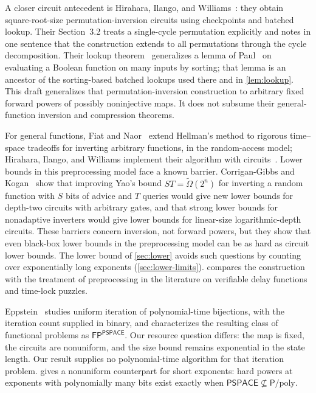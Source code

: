 \documentclass[11pt]{article}
\theoremstyle{definition}
\theoremstyle{remark}
\numberwithin{equation}{section}
\begin{document}
A closer circuit antecedent is Hirahara, Ilango, and
Williams~\cite[Section~3.2]{HIW24}: they obtain square-root-size
permutation-inversion circuits using checkpoints and batched lookup.
Their Section~3.2 treats a single-cycle permutation explicitly and notes
in one sentence that the construction extends to all permutations through
the cycle decomposition.  Their lookup theorem~\cite[Theorem~2.2]{HIW24}
generalizes a lemma of Paul~\cite[Lemma~2]{Paul76} on evaluating a
Boolean function on many inputs by sorting; that lemma is an ancestor of
the sorting-based batched lookups used there and in
\cref{lem:lookup}.  This draft generalizes
that permutation-inversion construction to arbitrary fixed forward powers
of possibly noninjective maps.  It does not subsume their general-function
inversion and compression theorems.

For general functions, Fiat and Naor~\cite{FN99} extend Hellman's method
to rigorous time--space tradeoffs for inverting arbitrary functions, in
the random-access model; Hirahara, Ilango, and Williams implement their
algorithm with circuits~\cite[Section~3.3]{HIW24}.  Lower bounds in this
preprocessing model face a known barrier.  Corrigan-Gibbs and
Kogan~\cite{CGK19} show that improving Yao's bound $ST=\widetilde\Omega(2^n)$
for inverting a random function with $S$ bits of advice and $T$ queries
would give new lower bounds for depth-two circuits with arbitrary gates,
and that strong lower bounds for nonadaptive inverters would give lower
bounds for linear-size logarithmic-depth circuits.  These barriers concern
inversion, not forward powers, but they show that even black-box lower
bounds in the preprocessing model can be as hard as circuit lower bounds.
The lower bound of \cref{sec:lower} avoids such questions by counting
over exponentially long exponents (\cref{sec:lower-limits}).   compares the
construction with the treatment of preprocessing in the literature on
verifiable delay functions and time-lock puzzles.

Eppstein~\cite{Eppstein23} studies uniform iteration of polynomial-time
bijections, with the iteration count supplied in binary, and characterizes
the resulting class of functional problems as
$\mathsf{FP}^{\mathsf{PSPACE}}$.  Our resource question differs: the map
is fixed, the circuits are nonuniform, and the size bound remains
exponential in the state length.  Our result supplies no polynomial-time
algorithm for that iteration problem.   gives a nonuniform
counterpart for short exponents: hard powers at exponents with
polynomially many bits exist exactly when
$\mathsf{PSPACE}\not\subseteq\mathsf{P}/\mathrm{poly}$.
\end{document}
